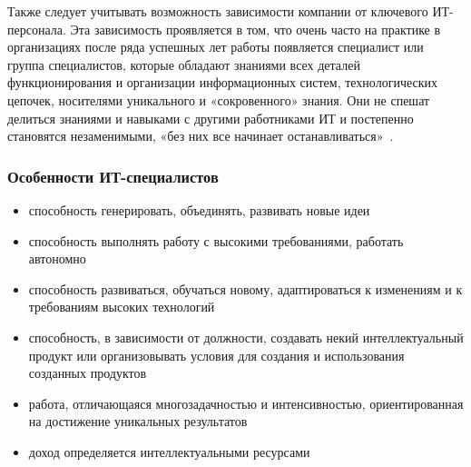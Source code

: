 \documentclass{../industrial-development}
\begin{document}
Также следует учитывать возможность зависимости компании от ключевого ИТ-персонала. Эта зависимость проявляется в том, что очень часто на практике в организациях после ряда успешных лет работы появляется специалист или группа специалистов, которые обладают знаниями всех деталей функционирования и организации информационных систем, технологических цепочек, носителями уникального и «сокровенного» знания. Они не спешат делиться знаниями и навыками с другими работниками ИТ и постепенно становятся незаменимыми, «без них все начинает останавливаться»~\cite[с.~51--52]{Tutunik}.

\begin{frame} \frametitle{Особенности ИТ-специалистов}
    
  \begin{itemize}
  \item способность генерировать, объединять, развивать новые идеи
	\item способность выполнять работу с высокими требованиями, работать автономно
	\item способность развиваться, обучаться новому, адаптироваться к изменениям и к требованиям высоких технологий
	\item способность, в зависимости от должности, создавать некий интеллектуальный продукт или организовывать условия для создания и использования созданных продуктов
	\item работа, отличающаяся многозадачностью и интенсивностью, ориентированная на достижение уникальных результатов
	\item доход определяется интеллектуальными ресурсами

    \end{itemize}
\end{frame}
\lecturenotes
\end{document}
